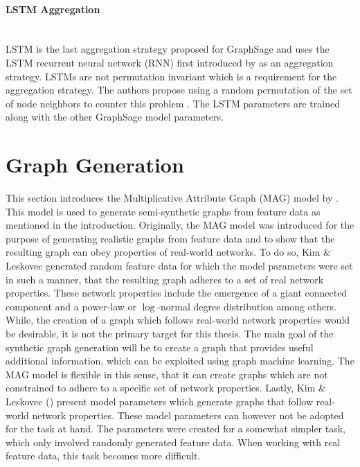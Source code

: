 	\paragraph{LSTM Aggregation} \mbox{}\\
	\noindent LSTM is the last aggregation strategy proposed for GraphSage and
	uses the LSTM recurrent neural network (RNN) first introduced by
	\cite{hochreiter1997long} as an aggregation strategy. LSTMs are not
	permutation invariant which is a requirement for the aggregation strategy.
	The authors propose using a random permutation of the set of node neighbors 
	to counter this problem \citep[p. 5]{hamilton2017inductive}. The LSTM
	parameters are trained along with the other GraphSage model parameters.  

	\section{Graph Generation}

	This section introduces the Multiplicative Attribute Graph (MAG) model by
	\cite{kim2012multiplicative}. This model is used to generate
	semi-synthetic graphs from feature data as mentioned in the introduction. 
	Originally, the MAG model was introduced for the purpose of generating 
	realistic graphs from feature data and to show that the resulting graph can 
	obey properties of real-world networks. To do so, Kim \& Leskovec generated 
	random feature data for which the model parameters were set in such a 
	manner, that the resulting graph adheres to a set of real network 
	properties. These network properties include the emergence of a giant
	connected component and a power-law or $\log$-normal degree distribution
	among others. While, the creation of a graph which follows real-world 
	network properties would be desirable, it is not the primary target for 
	this thesis. The main goal of the synthetic graph generation will be to 
	create a graph that provides useful additional information, which can be 
	exploited using graph machine learning. The MAG model is flexible in this 
	sense, that it can create graphs which are not constrained to adhere to a 
	specific set of network properties. Lastly, Kim \& Leskovec 
	(\citeyear[p. 138-139]{kim2012multiplicative}) present model parameters 
	which generate graphs that follow real-world network properties. These
	model parameters can however not be adopted for the task at hand. The
	parameters were created for a somewhat simpler task, which only involved
	randomly generated feature data. When working with real feature data, this 
	task becomes more difficult. \\


